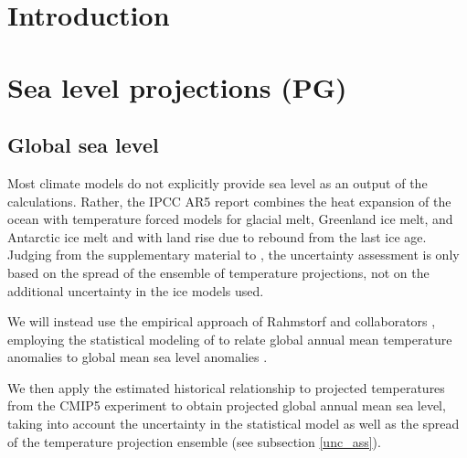 \documentclass[wrr, draft]{agutex}
\begin{document}
\begin{article}



\section{Introduction}\label{sec:intro}

\section{Sea level projections {\color{blue} (PG)}}



\subsection{Global sea level}
Most climate models do not explicitly provide sea level as an output of the calculations. Rather, the IPCC AR5 report \citep[ch.~13]{ipcc} combines the heat expansion of the ocean with temperature forced models for glacial melt, Greenland ice melt, and Antarctic ice melt and with land rise due to rebound from the last ice age. Judging from the supplementary material to \citet[ch.~13]{ipcc}, the uncertainty assessment is only based on the spread of the ensemble of temperature projections, not on the additional uncertainty in the ice models used.

We will instead use the empirical approach of Rahmstorf and collaborators \citep{Rahmstorf07,Rahmstorf11}, employing the statistical modeling of \citet{Bolin2014a} to relate global annual mean temperature anomalies \citep{giss} to global mean sea level anomalies \citep{csiro}. 


We then apply the estimated historical relationship to projected temperatures from the CMIP5 experiment \citep{cmip5} to obtain projected global annual mean sea level, taking into account the uncertainty in the statistical model as well as the spread of the temperature projection ensemble (see subsection \ref{unc_ass}). 



\end{article}
\end{document}
